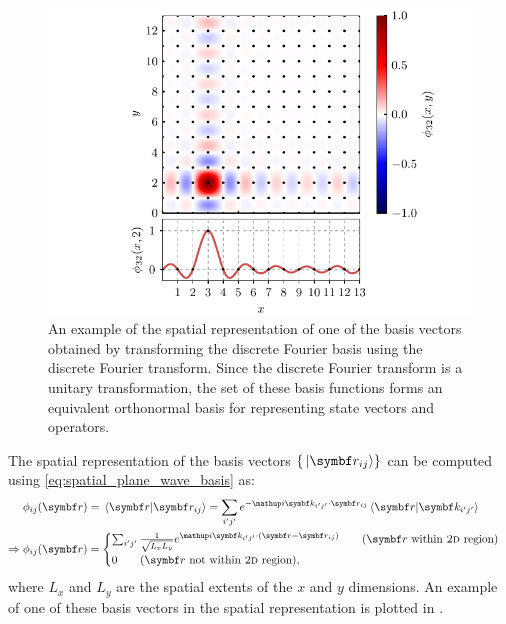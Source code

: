 \begin{figure}[t]
    \centerfloat
    \includegraphics[width=\textwidth]{figures/numerics/basis_vecs.pdf}
    \caption{An example of the spatial representation of one of the basis vectors obtained by transforming the discrete Fourier basis using the discrete Fourier transform. Since the discrete Fourier transform is a unitary transformation, the set of these basis functions forms an equivalent orthonormal basis for representing state vectors and operators.}

    \label{fig:basis_vecs}
\end{figure}

The spatial representation of the basis vectors $\{\ket{\vec r_{ij}}\}$ can be computed using \eqref{eq:spatial_plane_wave_basis} as:
\begin{align}
\phi_{ij}(\vec r) &= \braket{\vec r}{\vec r_{i j}} = \sum_{i^\prime j^\prime} e^{-\ii \vec k_{i^\prime j^\prime} \cdot \vec r_{i j}}\braket{\vec r}{\vec k_{i^\prime j^\prime}}\\
\Rightarrow \phi_{ij}(\vec r) &=\begin{cases}
\sum_{i^\prime j^\prime} \frac 1 {\sqrt {L_x L_y}} e^{\ii \vec k_{i^\prime j^\prime} \cdot (\vec r - \vec r_{i j})}\qquad (\vec r\ \textrm{within \textsc{2d} region})\\
0\qquad(\vec r\ \textrm{not within \textsc{2d} region}),
\end{cases}
\end{align}
where $L_x$ and $L_y$ are the spatial extents of the $x$ and $y$ dimensions. An example of one of these basis vectors in the spatial representation is plotted in .

